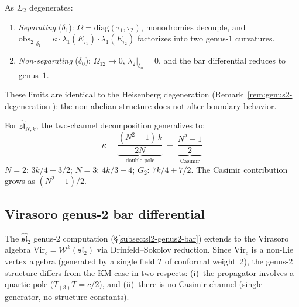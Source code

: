 \begin{remark}\label{rem:sl2-genus2-degeneration}
As $\Sigma_2$ degenerates:
\begin{enumerate}
\item \emph{Separating} ($\delta_1$): $\Omega = \mathrm{diag}(\tau_1, \tau_2)$, monodromies decouple, and $\mathrm{obs}_2|_{\delta_1} = \kappa \cdot \lambda_1(E_{\tau_1}) \cdot \lambda_1(E_{\tau_2})$ factorizes into two genus-$1$ curvatures.
\item \emph{Non-separating} ($\delta_0$): $\Omega_{12} \to 0$, $\lambda_2|_{\delta_0} = 0$, and the bar differential reduces to genus~$1$.
\end{enumerate}
These limits are identical to the Heisenberg degeneration (Remark~\ref{rem:genus2-degeneration}): the non-abelian structure does not alter boundary behavior.
\end{remark}

\begin{remark}\label{rem:genus2-higher-rank}
For $\widehat{\mathfrak{sl}}_{N,k}$, the two-channel decomposition generalizes to:
\begin{equation}\label{eq:slN-kappa-decomp-genus2}
\kappa = \underbrace{\frac{(N^2-1)\,k}{2N}}_{\text{double-pole}}
\;+\; \underbrace{\frac{N^2-1}{2}}_{\text{Casimir}}
\end{equation}
$N=2$: $3k/4 + 3/2$; $N=3$: $4k/3 + 4$; $G_2$: $7k/4 + 7/2$.  The Casimir contribution grows as $(N^2-1)/2$.
\end{remark}

\subsection{Virasoro genus-2 bar differential}\label{subsec:virasoro-genus2-bar}

The $\widehat{\mathfrak{sl}}_2$ genus-$2$ computation
(\S\ref{subsec:sl2-genus2-bar}) extends to the Virasoro algebra
$\mathrm{Vir}_c = \mathcal{W}^k(\mathfrak{sl}_2)$ via
Drinfeld--Sokolov reduction.  Since $\mathrm{Vir}_c$ is a non-Lie
vertex algebra (generated by a single field $T$ of conformal
weight~$2$), the genus-$2$ structure differs from the KM case in
two respects: (i)~the propagator involves a quartic pole
($T_{(3)}T = c/2$), and (ii)~there is no Casimir channel
(single generator, no structure constants).

